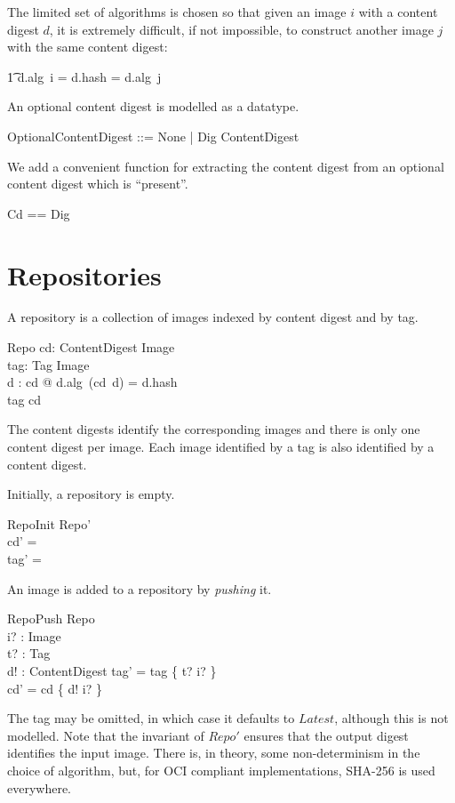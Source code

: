 \documentclass[a4paper,twoside,12pt]{article}
\begin{document}
The limited set of algorithms is chosen so that given an image $i$ with a content digest $d$, it is extremely difficult, if not impossible, to construct
another image $j$ with the same content digest:\\
\begin{zed}
\t1 d.alg~i = d.hash = d.alg~j
\end{zed}

An optional content digest is modelled as a datatype.
\begin{zed}
    OptionalContentDigest ::= None | Dig \ldata ContentDigest \rdata \\
\end{zed}

We add a convenient function for extracting the content digest from an optional content digest which is ``present''.
\begin{zed}
    Cd == Dig\inv \\
\end{zed}

\newpage
\section{Repositories}

A repository is a collection of images indexed by content digest and by tag.
\begin{schema}{Repo}
    cd: ContentDigest \pinj Image \\
    tag: Tag \pfun Image \\
\where
    \forall d : \dom cd @ d.alg~(cd~d) = d.hash \\
    \ran tag \subseteq \ran cd \\
\end{schema}
The content digests identify the corresponding images and there is only one content digest per image. Each image identified by a tag is also identified by a content digest.

Initially, a repository is empty.
\begin{schema}{RepoInit}
  Repo' \\
\where
  cd' = \emptyset \\
  tag' = \emptyset \\
\end{schema}
 
An image is added to a repository by \textit{pushing} it.
\begin{schema}{RepoPush}
  \Delta Repo \\
  i? : Image \\
  t? : Tag \\
  d! : ContentDigest
\where
  tag' = tag \oplus \{ t? \mapsto i? \} \\
  cd' = cd \oplus \{ d! \mapsto i? \} \\
\end{schema}
The tag may be omitted, in which case it defaults to $Latest$, although this is not modelled. Note that the invariant of $Repo'$ ensures that the output digest identifies the input image. There is, in theory, some non-determinism in the choice of algorithm, but, for OCI compliant implementations, SHA-256 is used everywhere.
\end{document}
